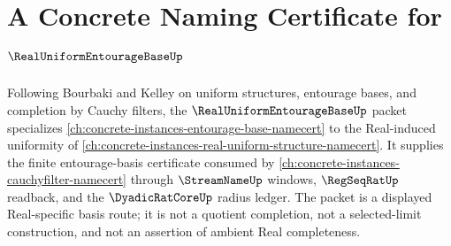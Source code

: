 \chapter{A Concrete Naming Certificate for $\RealUniformEntourageBaseUp$}
\label{ch:concrete-instances-real-uniform-entourage-base-namecert}

Following Bourbaki and Kelley on uniform structures, entourage bases, and completion by Cauchy filters, the $\RealUniformEntourageBaseUp$ packet specializes \autoref{ch:concrete-instances-entourage-base-namecert} to the Real-induced uniformity of \autoref{ch:concrete-instances-real-uniform-structure-namecert}. It supplies the finite entourage-basis certificate consumed by \autoref{ch:concrete-instances-cauchyfilter-namecert} through $\StreamNameUp$ windows, $\RegSeqRatUp$ readback, and the $\DyadicRatCoreUp$ radius ledger. The packet is a displayed Real-specific basis route; it is not a quotient completion, not a selected-limit construction, and not an assertion of ambient Real completeness.

